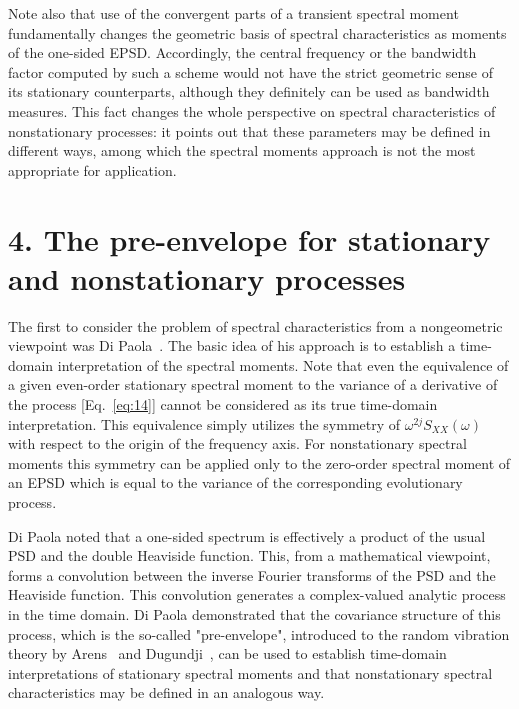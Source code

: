 \documentclass{article}
\begin{document}
Note also that use of the convergent parts of a transient spectral moment
fundamentally changes the geometric basis of spectral characteristics as
moments of the one-sided EPSD. Accordingly, the central frequency or the
bandwidth factor computed by such a scheme would not have the strict geometric
sense of its stationary counterparts, although they definitely can be used as
bandwidth measures. This fact changes the whole perspective on spectral
characteristics of nonstationary processes: it points out that these
parameters may be defined in different ways, among which the spectral moments
approach is not the most appropriate for application.

\section*{4. The pre-envelope for stationary and nonstationary processes}

The first to consider the problem of spectral characteristics from a
nongeometric viewpoint was Di Paola~{\cite{DiPaola1985}}. The basic idea of
his approach is to establish a time-domain interpretation of the spectral
moments. Note that even the equivalence of a given even-order stationary
spectral moment to the variance of a derivative of the process
[Eq.~\eqref{eq:14}] cannot be considered as its true time-domain
interpretation. This equivalence simply utilizes the symmetry of $\omega^{2 j}
S_{XX} (\omega)$ with respect to the origin of the frequency axis. For
nonstationary spectral moments this symmetry can be applied only to the
zero-order spectral moment of an EPSD which is equal to the variance of the
corresponding evolutionary process.

Di Paola noted that a one-sided spectrum is effectively a product of the usual
PSD and the double Heaviside function. This, from a mathematical viewpoint,
forms a convolution between the inverse Fourier transforms of the PSD and the
Heaviside function. This convolution generates a complex-valued analytic
process in the time domain. Di Paola demonstrated that the covariance
structure of this process, which is the so-called "pre-envelope", introduced
to the random vibration theory by Arens~{\cite{Arens1957}} and
Dugundji~{\cite{Dugundji1958}}, can be used to establish time-domain
interpretations of stationary spectral moments and that nonstationary spectral
characteristics may be defined in an analogous way.
\end{document}
